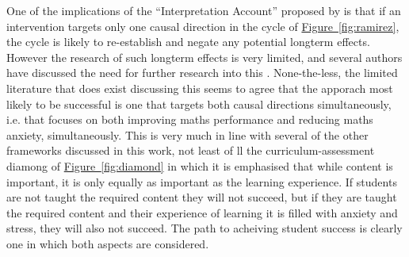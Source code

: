 \documentclass[twoside,12pt,a4paper]{report}
\newcommand{\reffig}[1]{\hyperref[fig:#1]{Figure~\ref{fig:#1}}}
\begin{document}
One of the implications of the ``Interpretation Account'' proposed by is that if an intervention targets only one causal direction in the cycle of \reffig{ramirez}, the cycle is likely to re-establish and negate any potential longterm effects. However the research of such longterm effects is very limited, and several authors have discussed the need for further research into this \cite{Pellicioni2016,Chang2016}. None-the-less, the limited literature that does exist discussing this seems to agree that the apporach most likely to be successful is one that targets both causal directions simultaneously, i.e. that focuses on both improving maths performance and reducing maths anxiety, simultaneously. This is very much in line with several of the other frameworks discussed in this work, not least of ll the curriculum-assessment diamong of \reffig{diamond} in which it is emphasised that while content is important, it is only equally as important as the learning experience. If students are not taught the required content they will not succeed, but if they are taught the required content and their experience of learning it is filled with anxiety and stress, they will also not succeed. The path to acheiving student success is clearly one in which both aspects are considered. 

%
\end{document}
